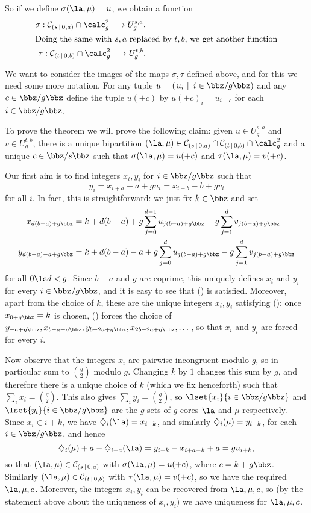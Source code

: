 \documentclass[a4paper, 11pt, twoside]{article}
\begin{document}
So if we define $\sigma(\la,\mu)=u$, we obtain a function
\begin{align*}
\sigma:\bc sa\cap\cores g^2\longrightarrow U_g^{s,a}.
\\
\intertext{Doing the same with $s,a$ replaced by $t,b$, we get another function}
\tau:\bc tb\cap\cores g^2\longrightarrow U_g^{t,b}.
\end{align*}

\begin{pf}
We want to consider the images of the maps $\sigma,\tau$ defined above, and for this we need some more notation. For any tuple $u=\ltup{u_i}{i\in\zgz}$ and any $c\in\zgz$ define the tuple $u(+c)$ by $u(+c)_i=u_{i+c}$ for each $i\in\zgz$.

To prove the theorem we will prove the following claim: given $u\in U_g^{s,a}$ and $v\in U_g^{t,b}$, there is a unique bipartition $(\la,\mu)\in\mc s{0,a}\cap\mc t{0,b}\cap\cores g^2$ and a unique $c\in\zsz$ such that $\sigma(\la,\mu)=u(+c)$ and $\tau(\la,\mu)=v(+c)$.

Our first aim is to find integers $x_i,y_i$ for $i\in\zgz$ such that
\[
y_i=x_{i+a}-a+gu_i=x_{i+b}-b+gv_i\tag*{(\textasteriskcentered)}
\]
for all $i$. In fact, this is straightforward: we just fix $k\in\bbz$ and set
\begin{align*}
x_{d(b-a)+g\bbz}&=k+d(b-a)+g\sum_{j=0}^{d-1}u_{j(b-a)+g\bbz}-g\sum_{j=1}^dv_{j(b-a)+g\bbz}\\
y_{d(b-a)-a+g\bbz}&=k+d(b-a)-a+g\sum_{j=0}^du_{j(b-a)+g\bbz}-g\sum_{j=1}^dv_{j(b-a)+g\bbz}
\end{align*}
for all $0\ls d<g$. Since $b-a$ and $g$ are coprime, this uniquely defines $x_i$ and $y_i$ for every $i\in\zgz$, and it is easy to see that (\textasteriskcentered) is satisfied. Moreover, apart from the choice of $k$, these are the unique integers $x_i,y_i$ satisfying (\textasteriskcentered): once $x_{0+g\bbz}=k$ is chosen, (\textasteriskcentered) forces the choice of $y_{-a+g\bbz},x_{b-a+g\bbz},y_{b-2a+g\bbz},x_{2b-2a+g\bbz},\dots$, so that $x_i$ and $y_i$ are forced for every $i$.

Now observe that the integers $x_i$ are pairwise incongruent modulo $g$, so in particular sum to $\binom g2$ modulo $g$. Changing $k$ by $1$ changes this sum by $g$, and therefore there is a unique choice of $k$ (which we fix henceforth) such that $\sum_ix_i=\binom g2$. This also gives $\sum_iy_i=\binom g2$, so $\lset{x_i}{i\in\zgz}$ and $\lset{y_i}{i\in\zgz}$ are the $g$-sets of $g$-cores $\la$ and $\mu$ respectively. Since $x_i\in i+k$, we have $\se i\la=x_{i-k}$, and similarly $\diamondsuit_{i}(\mu)=y_{i-k}$, for each $i\in\zgz$, and hence
\[
\se i\mu+a-\se{i+a}\la=y_{i-k}-x_{i+a-k}+a=gu_{i+k},
\]
so that $(\la,\mu)\in\mc s{0,a}$ with $\sigma(\la,\mu)=u(+c)$, where $c=k+g\bbz$. Similarly $(\la,\mu)\in\bc tb$ with $\tau(\la,\mu)=v(+c)$, so we have the required $\la,\mu,c$. Moreover, the integers $x_i,y_i$ can be recovered from $\la,\mu,c$, so (by the statement above about the uniqueness of $x_i,y_i$) we have uniqueness for $\la,\mu,c$.


\end{pf}
\end{document}
